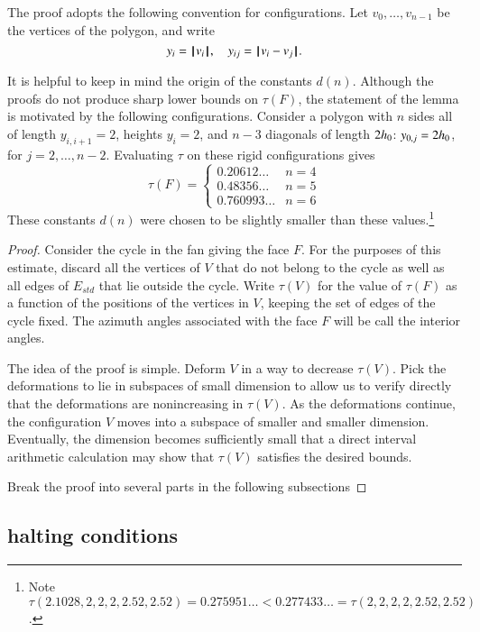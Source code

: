 {The proof adopts the following convention for
configurations.  Let $v_0,\ldots,v_{n-1}$ be the vertices
of the polygon, and write
$$
y_i = {{\hskip0.1em|\hskip-0.15em|\hskip0.1em}v_i{\hskip0.1em|\hskip-0.15em|\hskip0.1em}},\quad y_{ij} = {\hskip0.1em|\hskip-0.15em|\hskip0.1em}v_i -  v_j{\hskip0.1em|\hskip-0.15em|\hskip0.1em}.
$$

It is helpful to keep in mind the origin of the constants $d(n)$.
Although the proofs do not produce sharp lower bounds on $\tau(F)$, the
statement of the lemma is motivated by the following configurations.
Consider a polygon with $n$ sides all of length $y_{i,i+1}=2$, heights
$y_i=2$, and $n-3$ diagonals of length $2{h_0}$: $y_{0,j}=2{h_0}$, for
$j=2,\ldots,n-2$.  Evaluating $\tau$ on these rigid configurations gives
$$
\tau(F) = \begin{cases}
0.20612\ldots & n=4\\
0.48356\ldots & n=5\\
0.760993\ldots &n=6
\end{cases}
$$
These constants $d(n)$ were chosen to be slightly smaller than these values.\footnote{Note $\tau(2.1028,2,2,2,2.52,2.52) = 0.275951\ldots < 0.277433\ldots = \tau(2,2,2,2,2.52,2.52)$.}


\begin{proof}  Consider the cycle in the fan
giving the face $F$.  For the purposes of this
estimate,  discard all the vertices of $V$
that do not belong to the cycle as well as all edges
of $E_{std}$ that lie outside the cycle.
Write $\tau(V)$ for the value of $\tau(F)$ as a
function of the positions of the vertices in $V$,
keeping the set of edges of the cycle fixed.  The
azimuth angles associated with the face $F$ will be
call the interior angles.  

The idea of the proof is simple.   Deform $V$ in a way to decrease $\tau(V)$.  Pick the deformations to lie in subspaces of small dimension to allow us to verify directly that the deformations are nonincreasing in $\tau(V)$.  As the deformations continue, the configuration $V$ moves into a subspace of smaller and smaller dimension.  Eventually, the dimension becomes sufficiently small that a direct interval arithmetic calculation may show that $\tau(V)$ satisfies the desired bounds.

Break the proof into several parts in the following subsections
\end{proof}


\subsection{halting conditions}

}
